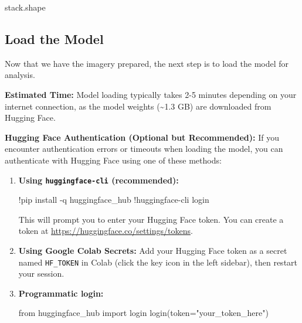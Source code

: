 \documentclass[
  letterpaper,
  DIV=11,
  numbers=noendperiod]{scrreprt}
\newenvironment{Shaded}{\begin{snugshade}}{\end{snugshade}}
\newcommand{\AttributeTok}[1]{\textcolor[rgb]{0.40,0.45,0.13}{#1}}
\newcommand{\ExtensionTok}[1]{\textcolor[rgb]{0.00,0.23,0.31}{#1}}
\newcommand{\ImportTok}[1]{\textcolor[rgb]{0.00,0.46,0.62}{#1}}
\newcommand{\NormalTok}[1]{\textcolor[rgb]{0.00,0.23,0.31}{#1}}
\newcommand{\OperatorTok}[1]{\textcolor[rgb]{0.37,0.37,0.37}{#1}}
\newcommand{\StringTok}[1]{\textcolor[rgb]{0.13,0.47,0.30}{#1}}
\begin{document}
\begin{Shaded}
\begin{Highlighting}[]
\NormalTok{stack.shape}
\end{Highlighting}
\end{Shaded}

\subsection{Load the Model}\label{load-the-model}

Now that we have the imagery prepared, the next step is to load the
model for analysis.

\textbf{Estimated Time:} Model loading typically takes 2-5 minutes
depending on your internet connection, as the model weights
(\textasciitilde1.3 GB) are downloaded from Hugging Face.

\textbf{Hugging Face Authentication (Optional but Recommended):} If you
encounter authentication errors or timeouts when loading the model, you
can authenticate with Hugging Face using one of these methods:

\begin{enumerate}
\def\labelenumi{\arabic{enumi}.}
\item
  \textbf{Using \texttt{huggingface-cli} (recommended):}

\begin{Shaded}
\begin{Highlighting}[]
\ExtensionTok{!pip}\NormalTok{ install }\AttributeTok{{-}q}\NormalTok{ huggingface\_hub}
\ExtensionTok{!huggingface{-}cli}\NormalTok{ login}
\end{Highlighting}
\end{Shaded}

  This will prompt you to enter your Hugging Face token. You can create
  a token at \url{https://huggingface.co/settings/tokens}.
\item
  \textbf{Using Google Colab Secrets:} Add your Hugging Face token as a
  secret named \texttt{HF\_TOKEN} in Colab (click the key icon in the
  left sidebar), then restart your session.
\item
  \textbf{Programmatic login:}

\begin{Shaded}
\begin{Highlighting}[]
\ImportTok{from}\NormalTok{ huggingface\_hub }\ImportTok{import}\NormalTok{ login}
\NormalTok{login(token}\OperatorTok{=}\StringTok{"your\_token\_here"}\NormalTok{)}
\end{Highlighting}
\end{Shaded}
\end{enumerate}
\end{document}
